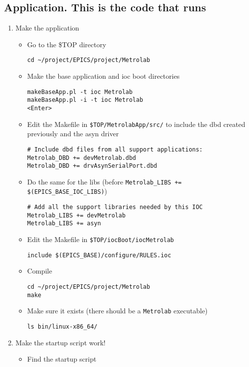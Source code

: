 \documentclass[11pt]{article}
\begin{document}
\subsection{Application. This is the code that runs}
\label{sec-1-2}
\begin{enumerate}
\item Make the application
\label{sec-1-2-1}
\begin{itemize}
\item Go to the \$TOP directory
\begin{verbatim}
cd ~/project/EPICS/project/Metrolab
\end{verbatim}
\item Make the base application and ioc boot directories
\begin{verbatim}
makeBaseApp.pl -t ioc Metrolab
makeBaseApp.pl -i -t ioc Metrolab
<Enter>
\end{verbatim}
\item Edit the Makefile in \verb~$TOP/MetrolabApp/src/~ to include the dbd
created previously and the asyn driver
\begin{verbatim}
# Include dbd files from all support applications:
Metrolab_DBD += devMetrolab.dbd
Metrolab_DBD += drvAsynSerialPort.dbd
\end{verbatim}
\item Do the same for the libs (before \verb~Metrolab_LIBS += $(EPICS_BASE_IOC_LIBS)~)
\begin{verbatim}
# Add all the support libraries needed by this IOC
Metrolab_LIBS += devMetrolab
Metrolab_LIBS += asyn
\end{verbatim}
\item Edit the Makefile in \verb~$TOP/iocBoot/iocMetrolab~
\begin{verbatim}
include $(EPICS_BASE)/configure/RULES.ioc
\end{verbatim}
\item Compile
\begin{verbatim}
cd ~/project/EPICS/project/Metrolab
make
\end{verbatim}
\item Make sure it exists (there should be a \verb~Metrolab~ executable)
\begin{verbatim}
ls bin/linux-x86_64/
\end{verbatim}
\end{itemize}
\item Make the startup script work!
\label{sec-1-2-2}
\begin{itemize}
\item Find the startup script

\end{itemize}
\end{enumerate}
\end{document}
